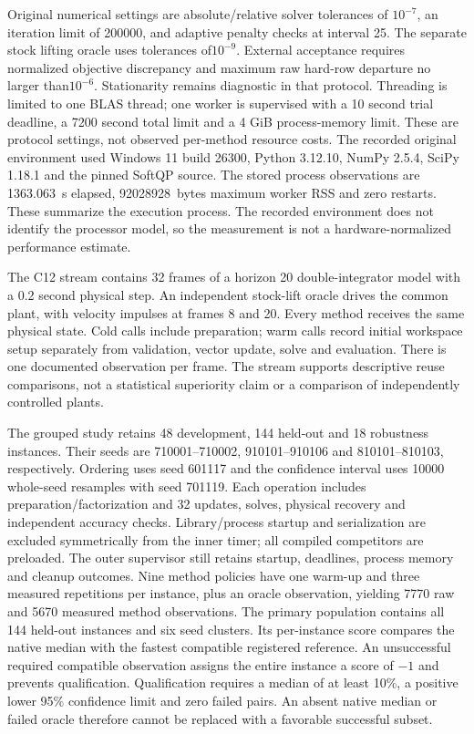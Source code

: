 Original numerical settings are absolute/relative solver tolerances of
$10^{-7}$, an iteration limit of 200000, and adaptive penalty checks at interval 25.
The separate stock lifting oracle uses tolerances of$10^{-9}$. External acceptance
requires normalized objective discrepancy and maximum raw hard-row departure
no larger than$10^{-6}$. Stationarity remains diagnostic in that protocol.
Threading is limited to one BLAS thread; one worker is supervised with a 10 second
trial deadline, a 7200 second total limit and a 4 GiB process-memory limit.
These are protocol settings, not observed per-method resource costs.
The recorded original environment used Windows 11 build 26300, Python
3.12.10, NumPy 2.5.4, SciPy 1.18.1 and the pinned SoftQP source. The stored
process observations are 1363.063~s elapsed, 92028928~bytes maximum worker
RSS and zero restarts. These summarize the execution process. The recorded
environment does not identify the processor model, so the measurement is
not a hardware-normalized performance estimate.

The C12 stream contains 32 frames of a horizon 20 double-integrator model with
a 0.2 second physical step. An independent stock-lift oracle drives the common
plant, with velocity impulses at frames 8 and 20. Every method receives the
same physical state. Cold calls include preparation; warm calls record
initial workspace setup separately from validation, vector update, solve
and evaluation. There is one documented observation per frame. The stream
supports descriptive reuse comparisons, not a statistical superiority claim
or a comparison of independently controlled plants.

The grouped study retains 48 development, 144 held-out and 18 robustness
instances. Their seeds are 710001--710002, 910101--910106 and 810101--810103,
respectively. Ordering uses seed 601117 and the confidence interval uses
10000 whole-seed resamples with seed 701119.
Each operation includes preparation/factorization and 32 updates, solves,
physical recovery and independent accuracy checks. Library/process startup
and serialization are excluded symmetrically from the inner timer; all
compiled competitors are preloaded. The outer supervisor still retains
startup, deadlines, process memory and cleanup outcomes. Nine method policies
have one warm-up and three measured repetitions per instance, plus an oracle
observation, yielding 7770 raw and 5670 measured method observations. The primary
population contains all 144 held-out instances and six seed clusters. Its
per-instance score compares the native median with the fastest compatible
registered reference. An unsuccessful required compatible observation
assigns the entire instance a score of $-1$ and prevents qualification.
Qualification requires a median of at least 10\%, a positive lower
95\% confidence limit and zero failed pairs. An absent native median or
failed oracle therefore cannot be replaced with a favorable successful
subset.
